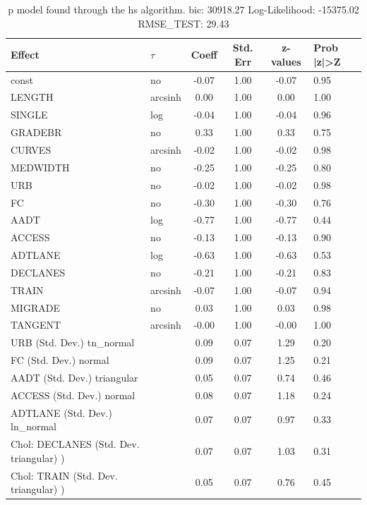 \begin{table}
	\caption{p model found through the hs algorithm. bic: 30918.27 Log-Likelihood: -15375.02 RMSE_TEST: 29.43}
	\begin{center}
		\begin{tabular}{|l|l|c|c|c|l|}
			\hline
			Effect & $\tau$ & Coeff & Std. Err & z-values & Prob |z|>Z \\
			\hline
			const & no & -0.07 & 1.00 & -0.07 & 0.95 \\
			\hline
			LENGTH & arcsinh & 0.00 & 1.00 & 0.00 & 1.00 \\
			\hline
			SINGLE & log & -0.04 & 1.00 & -0.04 & 0.96 \\
			\hline
			GRADEBR & no & 0.33 & 1.00 & 0.33 & 0.75 \\
			\hline
			CURVES & arcsinh & -0.02 & 1.00 & -0.02 & 0.98 \\
			\hline
			MEDWIDTH & no & -0.25 & 1.00 & -0.25 & 0.80 \\
			\hline
			URB & no & -0.02 & 1.00 & -0.02 & 0.98 \\
			\hline
			FC & no & -0.30 & 1.00 & -0.30 & 0.76 \\
			\hline
			AADT & log & -0.77 & 1.00 & -0.77 & 0.44 \\
			\hline
			ACCESS & no & -0.13 & 1.00 & -0.13 & 0.90 \\
			\hline
			ADTLANE & log & -0.63 & 1.00 & -0.63 & 0.53 \\
			\hline
			DECLANES & no & -0.21 & 1.00 & -0.21 & 0.83 \\
			\hline
			TRAIN & arcsinh & -0.07 & 1.00 & -0.07 & 0.94 \\
			\hline
			MIGRADE & no & 0.03 & 1.00 & 0.03 & 0.98 \\
			\hline
			TANGENT & arcsinh & -0.00 & 1.00 & -0.00 & 1.00 \\
			\hline
			URB (Std. Dev.) tn_normal &  & 0.09 & 0.07 & 1.29 & 0.20 \\
			\hline
			FC (Std. Dev.) normal &  & 0.09 & 0.07 & 1.25 & 0.21 \\
			\hline
			AADT (Std. Dev.) triangular &  & 0.05 & 0.07 & 0.74 & 0.46 \\
			\hline
			ACCESS (Std. Dev.) normal &  & 0.08 & 0.07 & 1.18 & 0.24 \\
			\hline
			ADTLANE (Std. Dev.) ln_normal &  & 0.07 & 0.07 & 0.97 & 0.33 \\
			\hline
			 Chol: DECLANES (Std. Dev. triangular) ) &  & 0.07 & 0.07 & 1.03 & 0.31 \\
			\hline
			 Chol: TRAIN (Std. Dev. triangular) ) &  & 0.05 & 0.07 & 0.76 & 0.45 \\

\end{tabular}
\end{center}
\end{table}
